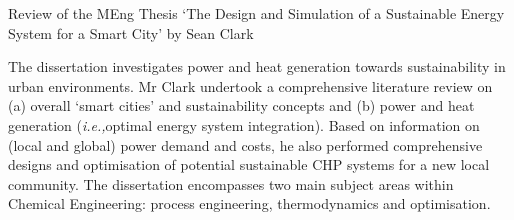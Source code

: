 \documentclass[14pt,twoside]{report}
\newcommand{\ie}{{\it i.e.,}}
\begin{document}
\clearpage




\bigskip

\begin{center}
  {\Large Review of the MEng Thesis `The Design and Simulation of a Sustainable Energy System for a Smart City' by Sean Clark}
\end{center}
The dissertation investigates power and heat generation towards sustainability in urban environments. Mr Clark undertook a comprehensive literature review on (a) overall `smart cities' and sustainability concepts and (b) power and heat generation (\ie optimal energy system integration). Based on information on (local and global) power demand and costs, he also performed comprehensive designs and optimisation of potential sustainable CHP systems for a new local community. The dissertation encompasses two main subject areas within Chemical Engineering: process engineering, thermodynamics and optimisation. 
\end{document}
